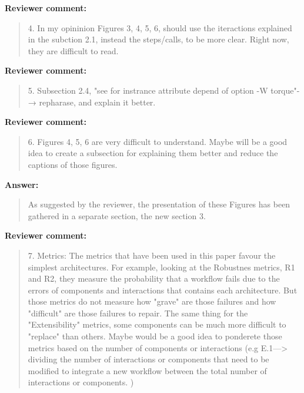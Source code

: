 \documentclass[a4]{article}
\newenvironment{review}%
{\textbf{Reviewer comment:}\begin{quote}}%
{\end{quote}}%
\newenvironment{answer}%
{\textbf{Answer:}\begin{small}\begin{quote}}%
{\end{quote}\end{small}}%
\begin{document}
\begin{review}
  4. In my opininion Figures 3, 4, 5, 6, should use the iteractions
  explained in the subction 2.1, instead the steps/calls, to be more
  clear. Right now, they are difficult to read.
\end{review}

\begin{review}
  5.  Subsection 2.4, "see for instrance attribute depend of option -W
  torque"-→ repharase, and explain it better.
\end{review}

\begin{review}
6.  Figures 4, 5, 6 are very difficult to understand. Maybe will be a
good idea to create a subsection for explaining them better and reduce
the captions of those figures.
\end{review}

\begin{answer}
As suggested by the reviewer, the presentation of these Figures has been gathered in a separate section, the new section 3.
\end{answer}

\begin{review}
  7.  Metrics: The metrics that have been used in this paper favour
  the simplest architectures. For example, looking at the Robustnes
  metrics, R1 and R2, they measure the probability that a workflow
  fails due to the errors of components and interactions that contains
  each architecture. But those metrics do not measure how "grave" are
  those failures and how "difficult" are those failures to repair. The
  same thing for the "Extensibility" metrics, some components can be
  much more difficult to "replace" than others.  Maybe would be a good
  idea to ponderete those metrics based on the number of components or
  interactions (e.g E.1---> dividing the number of interactions or
  components that need to be modified to integrate a new workflow
  between the total number of interactions or components. )
\end{review}
\end{document}
